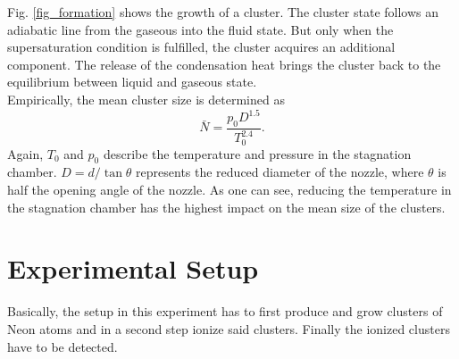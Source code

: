 \documentclass[a4paper,10pt]{article}
\begin{document}
Fig. \ref{fig_formation} shows the growth of a cluster. The cluster state follows an adiabatic line from the gaseous into the fluid state. But only when the supersaturation condition is fulfilled, the cluster acquires an additional component. The release of the condensation heat brings the cluster back to the equilibrium between liquid and gaseous state. \\
Empirically, the mean cluster size is determined as
\begin{equation}
	\bar{N} = \frac{p_0 D^{1.5}}{T_0^{2.4}}.
\end{equation}
Again, $T_0$ and $p_0$ describe the temperature and pressure in the stagnation chamber. $D = d / \tan \theta$ represents the reduced diameter of the nozzle, where $\theta$ is half the opening angle of the nozzle. As one can see, reducing the temperature in the stagnation chamber has the highest impact on the mean size of the clusters.

\section{Experimental Setup}
Basically, the setup in this experiment has to first produce and grow clusters of Neon atoms and in a second step ionize said clusters. Finally the ionized clusters have to be detected.
\end{document}
